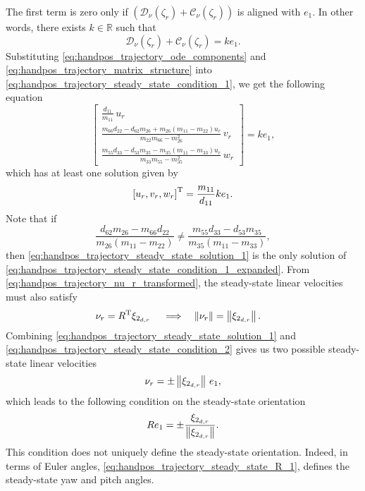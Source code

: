 The first term is zero only if $\left(\mathcal{D}_{\nu}(\zeta_r) + \mathcal{C}_{\nu}(\zeta_r)\right)$ is aligned with $e_1$.
In other words, there exists $k \in \mathbb{R}$ such that
\begin{equation}
    \mathcal{D}_{\nu}(\zeta_r) + \mathcal{C}_{\nu}(\zeta_r) = k e_1. \label{eq:handpos_trajectory_steady_state_condition_1}
\end{equation}
Substituting \eqref{eq:handpos_trajectory_ode_components} and \eqref{eq:handpos_trajectory_matrix_structure} into \eqref{eq:handpos_trajectory_steady_state_condition_1}, we get the following equation
\begin{equation}
    \begin{bmatrix}
        \frac{d_{11}}{m_{11}}\,u_r \\
        \frac{m_{66}d_{22} - d_{62}m_{26} + m_{26}\left(m_{11} - m_{22}\right)u_r}{m_{22}m_{66} - m_{26}^2}\,v_r \\
        \frac{m_{55}d_{33} - d_{53}m_{35} - m_{35}\left(m_{11} - m_{33}\right)u_r}{m_{33}m_{55} - m_{35}^2}\,w_r
    \end{bmatrix}
     = k e_1, \label{eq:handpos_trajectory_steady_state_condition_1_expanded}
\end{equation}
which has at least one solution given by
\begin{equation}
    \left[u_r, v_r, w_r\right]^{\mathrm{T}} = \frac{m_{11}}{d_{11}} k e_1. \label{eq:handpos_trajectory_steady_state_solution_1}
\end{equation}
Note that if
\begin{equation}
    \frac{d_{62}m_{26} - m_{66}d_{22}}{m_{26}\left(m_{11} - m_{22}\right)}
    \neq
    \frac{m_{55}d_{33} - d_{53}m_{35}}{m_{35}\left(m_{11} - m_{33}\right)},
    \label{eq:handpos_trajectory_inequality}
\end{equation}
then \eqref{eq:handpos_trajectory_steady_state_solution_1} is the only solution of \eqref{eq:handpos_trajectory_steady_state_condition_1_expanded}.
From \eqref{eq:handpos_trajectory_nu_r_transformed}, the steady-state linear velocities must also satisfy
\begin{align}
    \nu_r &= R^{\mathrm{T}} \xi_{2_{d, r}}& &\implies& \left\|\nu_r\right\| &= \left\|\xi_{2_{d, r}}\right\|. \label{eq:handpos_trajectory_steady_state_condition_2}
\end{align}
Combining \eqref{eq:handpos_trajectory_steady_state_solution_1} and \eqref{eq:handpos_trajectory_steady_state_condition_2} gives us two possible steady-state linear velocities
\begin{equation}
    \nu_r = \pm \left\|\xi_{2_{d, r}}\right\|\,e_1,
\end{equation}
which leads to the following condition on the steady-state orientation
\begin{equation}
    R e_1 = \pm \frac{\xi_{2_{d, r}}}{\left\|\xi_{2_{d, r}}\right\|}. \label{eq:handpos_trajectory_steady_state_R_1}
\end{equation}
This condition does not uniquely define the steady-state orientation.
Indeed, in terms of Euler angles, \eqref{eq:handpos_trajectory_steady_state_R_1}, defines the steady-state yaw and pitch angles.

